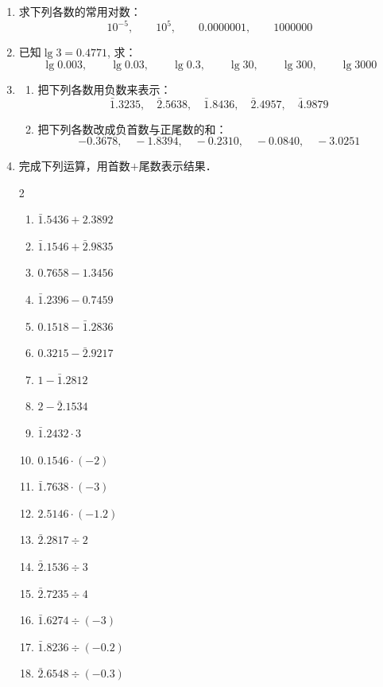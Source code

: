 \begin{ex}
\begin{enumerate}
    \item 求下列各数的常用对数：
\[10^{-5},\qquad 10^5,\qquad 0.0000001,\qquad 1000000\]

\item 已知$\lg 3=0.4771$, 求：
\[\lg0.003,\qquad \lg0.03,\qquad \lg0.3,\qquad \lg30,\qquad \lg300,\qquad \lg3000\]

\item \begin{enumerate}
    \item 把下列各数用负数来表示：
    \[\bar{1}.3235,\quad \bar{2}.5638,\quad \bar{1}.8436,\quad \bar{2}.4957,\quad \bar{4}.9879\]
    \item 把下列各数改成负首数与正尾数的和：
    \[-0.3678,\quad-1.8394,\quad-0.2310,\quad-0.0840,\quad-3.0251\]
\end{enumerate}

\item  完成下列运算，用首数$+$尾数表示结果．
\begin{multicols}{2}
\begin{enumerate}
    \item $\bar{1}.5436+2.3892$
    \item $\bar{1}.1546+\bar{2}.9835$
    \item $0.7658-1.3456$
    \item $\bar{1}.2396-0.7459$
    \item $0.1518-\bar{1}.2836$
    \item $0.3215-\bar{2}.9217$
    \item $1-\bar{1}.2812$
    \item $2-\bar{2}.1534$
    \item $\bar{1}.2432\cdot 3$
    \item $0.1546\cdot (-2)$
    \item $\bar{1}.7638\cdot (-3)$
    \item $2.5146\cdot (-1.2)$
    \item $\bar{2}.2817\div 2$
    \item $\bar{2}.1536\div 3$
    \item $\bar{2}.7235\div 4$
    \item $\bar{1}.6274\div (-3)$
    \item $\bar{1}.8236\div (-0.2)$
    \item $\bar{2}.6548\div (-0.3)$  
\end{enumerate}
\end{multicols}


\end{enumerate}
\end{ex}

